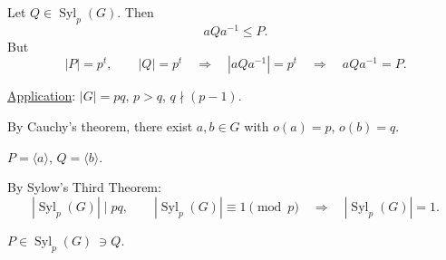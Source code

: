 \medskip
\noindent Let $Q\in\operatorname{Syl}_p(G)$. Then
\[
aQa^{-1}\leq P.
\]
\noindent But
\[
|P|=p^t,\qquad |Q|=p^t
\quad\Longrightarrow\quad |aQa^{-1}|=p^t
\quad\Longrightarrow\quad aQa^{-1}=P.
\]

\bigskip
\noindent\underline{Application}: $|G|=pq$, $p>q$, $q\nmid(p-1)$.

\medskip
\noindent By Cauchy's theorem, there exist $a,b\in G$ with
$o(a)=p$, $o(b)=q$.

\noindent $P=\langle a\rangle$, $Q=\langle b\rangle$.

\noindent By Sylow's Third Theorem:
\[
|\operatorname{Syl}_p(G)|\mid pq,
\qquad |\operatorname{Syl}_p(G)|\equiv1\pmod p
\quad\Longrightarrow\quad |\operatorname{Syl}_p(G)|=1.
\]

\noindent $P\in\operatorname{Syl}_p(G)\ \ni Q$.%

